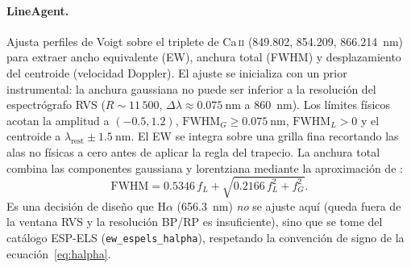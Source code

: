 \paragraph{LineAgent.} Ajusta perfiles de Voigt sobre el triplete de Ca\,\textsc{ii}
(849.802, 854.209, \SI{866.214}{\nano\meter}) para extraer ancho equivalente (EW),
anchura total (FWHM) y desplazamiento del centroide (velocidad Doppler). El ajuste
se inicializa con un prior instrumental: la anchura gaussiana no puede ser inferior
a la resolución del espectrógrafo RVS ($R \sim 11\,500$, $\Delta\lambda \approx
\SI{0.075}{\nano\meter}$ a \SI{860}{\nano\meter}). Los límites físicos acotan la
amplitud a $(-0.5, 1.2)$, $\mathrm{FWHM}_G \ge \SI{0.075}{\nano\meter}$,
$\mathrm{FWHM}_L > 0$ y el centroide a $\lambda_\mathrm{rest} \pm
\SI{1.5}{\nano\meter}$. El EW se integra sobre una grilla fina recortando las alas
no físicas a cero antes de aplicar la regla del trapecio. La anchura total combina
las componentes gaussiana y lorentziana mediante la aproximación de
\citet{thompson1987}:
\begin{equation}
  \mathrm{FWHM} = 0.5346\,f_L + \sqrt{0.2166\,f_L^2 + f_G^2}.
  \label{eq:fwhm}
\end{equation}
Es una decisión de diseño que H$\alpha$ (\SI{656.3}{\nano\meter}) \emph{no} se
ajuste aquí (queda fuera de la ventana RVS y la resolución BP/RP es
insuficiente), sino que se tome del catálogo ESP-ELS (\verb|ew_espels_halpha|),
respetando la convención de signo de la ecuación~\eqref{eq:halpha}.

